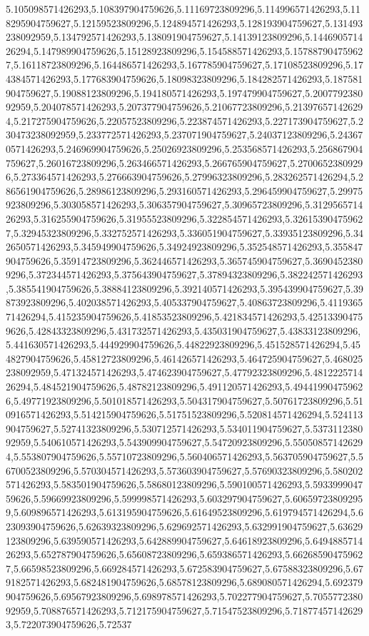 5.105098571426293,5.108397904759626,5.11169723809296,5.114996571426293,5.118295904759627,5.12159523809296,5.124894571426293,5.128193904759627,5.131493238092959,5.134792571426293,5.138091904759627,5.14139123809296,5.144690571426294,5.147989904759626,5.15128923809296,5.154588571426293,5.157887904759627,5.16118723809296,5.164486571426293,5.167785904759627,5.17108523809296,5.174384571426293,5.177683904759626,5.18098323809296,5.184282571426293,5.187581904759627,5.19088123809296,5.194180571426293,5.197479904759627,5.200779238092959,5.204078571426293,5.207377904759626,5.21067723809296,5.213976571426294,5.217275904759626,5.22057523809296,5.223874571426293,5.227173904759627,5.230473238092959,5.233772571426293,5.237071904759627,5.24037123809296,5.243670571426293,5.246969904759626,5.25026923809296,5.253568571426293,5.256867904759627,5.26016723809296,5.263466571426293,5.266765904759627,5.27006523809296,5.273364571426293,5.276663904759626,5.27996323809296,5.283262571426294,5.286561904759626,5.28986123809296,5.293160571426293,5.296459904759627,5.29975923809296,5.303058571426293,5.306357904759627,5.30965723809296,5.312956571426293,5.316255904759626,5.31955523809296,5.322854571426293,5.326153904759627,5.32945323809296,5.332752571426293,5.336051904759627,5.33935123809296,5.342650571426293,5.345949904759626,5.34924923809296,5.352548571426293,5.355847904759626,5.35914723809296,5.362446571426293,5.365745904759627,5.36904523809296,5.372344571426293,5.375643904759627,5.37894323809296,5.382242571426293,5.385541904759626,5.38884123809296,5.392140571426293,5.395439904759627,5.39873923809296,5.402038571426293,5.405337904759627,5.40863723809296,5.411936571426294,5.415235904759626,5.41853523809296,5.421834571426293,5.425133904759626,5.42843323809296,5.431732571426293,5.435031904759627,5.43833123809296,5.441630571426293,5.444929904759626,5.44822923809296,5.451528571426294,5.454827904759626,5.45812723809296,5.461426571426293,5.464725904759627,5.468025238092959,5.471324571426293,5.474623904759627,5.47792323809296,5.481222571426294,5.484521904759626,5.48782123809296,5.491120571426293,5.494419904759626,5.49771923809296,5.501018571426293,5.504317904759627,5.50761723809296,5.510916571426293,5.514215904759626,5.51751523809296,5.520814571426294,5.524113904759627,5.52741323809296,5.530712571426293,5.534011904759627,5.537311238092959,5.540610571426293,5.543909904759627,5.54720923809296,5.550508571426294,5.553807904759626,5.55710723809296,5.560406571426293,5.563705904759627,5.56700523809296,5.570304571426293,5.573603904759627,5.57690323809296,5.580202571426293,5.583501904759626,5.58680123809296,5.590100571426293,5.593399904759626,5.59669923809296,5.599998571426293,5.603297904759627,5.606597238092959,5.609896571426293,5.613195904759626,5.61649523809296,5.619794571426294,5.623093904759626,5.62639323809296,5.629692571426293,5.632991904759627,5.63629123809296,5.639590571426293,5.642889904759627,5.64618923809296,5.649488571426293,5.652787904759626,5.65608723809296,5.659386571426293,5.662685904759627,5.66598523809296,5.669284571426293,5.672583904759627,5.67588323809296,5.679182571426293,5.682481904759626,5.68578123809296,5.689080571426294,5.692379904759626,5.69567923809296,5.698978571426293,5.702277904759627,5.705577238092959,5.708876571426293,5.712175904759627,5.71547523809296,5.718774571426293,5.722073904759626,5.72537